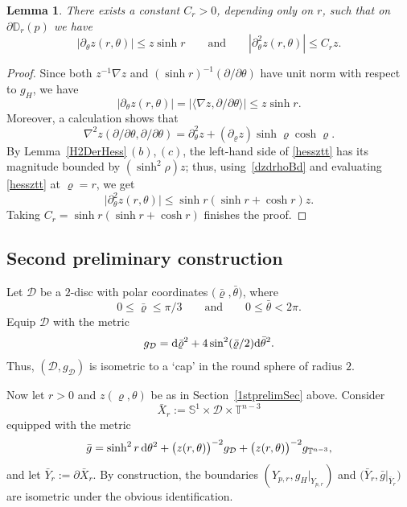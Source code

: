 \documentclass[10pt,a4paper]{amsart}
\numberwithin{equation}{section}
\newtheorem{Lemma}[Theorem]{Lemma}
\def\S{\mathbb{S}}
\def\T{\mathbb{T}}
\def\D{\mathbb{D}}
\def\Dcal{\mathcal{D}}
\def\ed{{\rm d}}
\begin{document}
\begin{Lemma}\label{dthetazEst}
	There exists a constant $C_r>0$, depending only on $r$, such that on $\partial\D_r(p)$ we have
	\begin{equation*}
		\left|\partial_\theta z (r,\theta)\right| \le z \sinh r \qquad
		\mbox{and}\qquad
		\left|\partial_\theta^2 z(r,\theta)\right| \le C_r z.
	\end{equation*}
\end{Lemma}
\begin{proof}
	Since both $z^{-1}\nabla z$ and $(\sinh r)^{-1}(\partial/\partial\theta)$
	have unit norm with respect to $g_{H}$, we have
	\[
		|\partial_\theta z(r,\theta)| = \left|\bigl\langle\nabla z, \partial/\partial\theta\bigr\rangle\right|
		\le z\sinh r.
	\]
	Moreover, a calculation shows that
	\begin{equation}\label{hessztt}
		\nabla^2 z (\partial/\partial\theta,\partial/\partial\theta)
		= \partial_\theta^2 z  +(\partial_\varrho z) \sinh \varrho \cosh \varrho.
	\end{equation}
	By Lemma~\ref{H2DerHess}\,$(b)$,\,$(c)$, the left-hand side of \eqref{hessztt} has its magnitude bounded
	by $(\sinh^2\rho)z$; thus, using~\eqref{dzdrhoBd} and evaluating
	\eqref{hessztt} at $\varrho = r$, we get
	\[
		\big|\partial_\theta^2 z(r,\theta)\big| \le \sinh r (\sinh r + \cosh r) z.
	\]
	Taking $C_r  = \sinh r(\sinh r + \cosh r)$ finishes the proof.
\end{proof}


\subsection{Second preliminary construction}\label{2ndprelimSec}
Let $\Dcal$ be a $2$-disc with polar coordinates $\bigl(\bar\varrho,\bar\theta\bigr)$, where
\[
	0\le \bar\varrho\le \pi/3 \qquad \mbox{and}\qquad 0\le \bar \theta<2\pi.
\]
Equip $\Dcal$ with the metric
\[
	g_\Dcal = \ed\bar\varrho^2 + 4\sin^2(\bar\varrho/2)\ed\bar\theta^2.
\]
Thus, $(\Dcal, g_\Dcal)$ is isometric to a `cap' in the round sphere of radius $2$.

Now let $r >0$ and $z(\varrho,\theta)$ be as in Section~\ref{1stprelimSec} above. Consider
\begin{equation*}
	\bar X_r := \S^1 \times \Dcal \times \T^{n-3}
\end{equation*}
equipped with the metric
\begin{equation}\label{barg}
\bar g =\sinh^ 2r \,\ed\theta^2 +\bigl(z(r,\theta)\bigr)^{-2} g_\Dcal+\bigl(z(r,\theta)\bigr)^{-2}g_{\T^{n-3}},
\end{equation}
and let $\bar Y_r := \partial \bar X_r$.
By construction, the boundaries $(Y_{p,r}, g_H|_{Y_{p,r}})$ and $\bigl(\bar Y_r, \bar g|_{\bar Y_r}\bigr)$ are isometric under the obvious identification.
\end{document}
